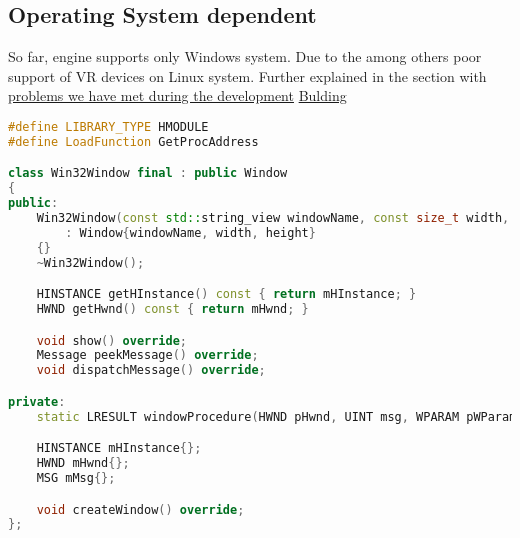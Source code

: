 \newpage

\subsection{Operating System dependent}
\label{sec:os}

So far, engine supports only Windows system. Due to the among others poor support of VR devices on Linux system.
Further explained in the section with \hyperref[sec:problems]{problems we have met during the development}
\hyperref[sec:building]{Bulding}
\begin{lstlisting}[language=c++, caption=(./engine/src/os/win32/os.cpp)]
#define LIBRARY_TYPE HMODULE
#define LoadFunction GetProcAddress

class Win32Window final : public Window
{
public:
    Win32Window(const std::string_view windowName, const size_t width, const size_t height)
        : Window{windowName, width, height}
    {}
    ~Win32Window();

    HINSTANCE getHInstance() const { return mHInstance; }
    HWND getHwnd() const { return mHwnd; }

    void show() override;
    Message peekMessage() override;
    void dispatchMessage() override;

private:
    static LRESULT windowProcedure(HWND pHwnd, UINT msg, WPARAM pWParam, LPARAM wLParam);

    HINSTANCE mHInstance{};
    HWND mHwnd{};
    MSG mMsg{};

    void createWindow() override;
};
\end{lstlisting}

